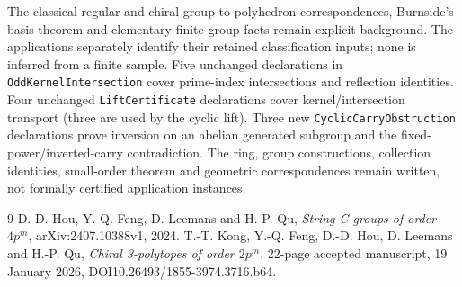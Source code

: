The classical regular and chiral group-to-polyhedron correspondences,
Burnside's basis theorem and elementary finite-group facts remain
explicit background. The applications separately identify their
retained classification inputs; none is inferred from a finite sample.
Five unchanged declarations in \texttt{OddKernelIntersection} cover
prime-index intersections and reflection identities. Four unchanged
\texttt{LiftCertificate} declarations cover kernel/intersection
transport (three are used by the cyclic lift). Three new
\texttt{CyclicCarryObstruction} declarations prove inversion on an
abelian generated subgroup and the fixed-power/inverted-carry
contradiction. The ring, group constructions, collection identities,
small-order theorem and geometric correspondences remain written,
not formally certified application instances.
\begin{thebibliography}{9}
 D.-D. Hou, Y.-Q. Feng, D. Leemans and H.-P. Qu,
\emph{String C-groups of order $4p^m$}, arXiv:2407.10388v1, 2024.
 T.-T. Kong, Y.-Q. Feng, D.-D. Hou, D. Leemans and H.-P. Qu,
\emph{Chiral 3-polytopes of order $2p^m$}, 22-page accepted manuscript,
19 January 2026, DOI10.26493/1855-3974.3716.b64.
\end{thebibliography}
